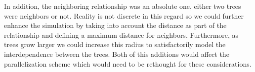 \documentclass[letterpaper,twoside,11pt]{article}
\begin{document}
\begin{multicols}{2}
In addition, the neighboring relationship was an absolute one, either two trees were neighbors or not. Reality is not discrete in this regard so we could further enhance the simulation by taking into account the distance as part of the relationship and defining a maximum distance for neighbors. Furthermore, as trees grow larger we could increase this radius to satisfactorily model the interdependence between the trees. Both of this additions would affect the parallelization scheme which would need to be rethought for these considerations.



\nocite{*}



 


\end{multicols}
\end{document}

